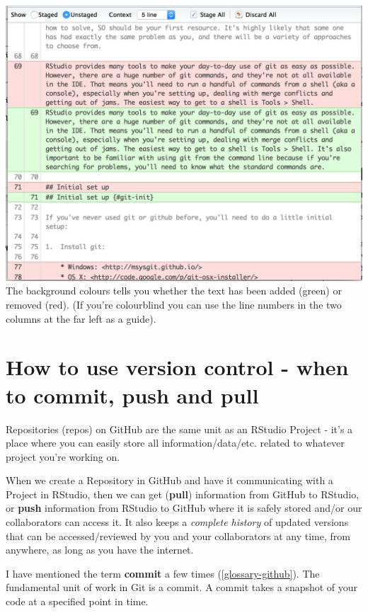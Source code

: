 \documentclass[
]{book}
\begin{document}
\includegraphics[width=18.61in]{images/git-diff-window}
The background colours tells you whether the text has been added (green) or removed (red). (If you're colourblind you can use the line numbers in the two columns at the far left as a guide).

\hypertarget{how-to-use-version-control---when-to-commit-push-and-pull}{%
\section{How to use version control - when to commit, push and pull}\label{how-to-use-version-control---when-to-commit-push-and-pull}}

Repositories (repos) on GitHub are the same unit as an RStudio Project - it's a place where you can easily store all information/data/etc. related to whatever project you're working on.

When we create a Repository in GitHub and have it communicating with a Project in RStudio, then we can get (\textbf{pull}) information from GitHub to RStudio, or \textbf{push} information from RStudio to GitHub where it is safely stored and/or our collaborators can access it. It also keeps a \emph{complete history} of updated versions that can be accessed/reviewed by you and your collaborators at any time, from anywhere, as long as you have the internet.

I have mentioned the term \textbf{commit} a few times (\ref{glossary-github}). The fundamental unit of work in Git is a commit. A commit takes a snapshot of your code at a specified point in time.
\end{document}

